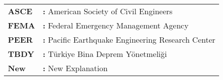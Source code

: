 \hspace{-3mm} %
\begin{tabular}{p{2cm}l}
\textbf{ASCE} & \textbf{:} American Society of Civil Engineers \tabularnewline
\textbf{FEMA}  & \textbf{:} Federal Emergency Management Agency \tabularnewline
\textbf{PEER}  & \textbf{:} Pacific Earthquake Engineering Research Center \tabularnewline
\textbf{TBDY}  & \textbf{:} Türkiye Bina Deprem Yönetmeliği \tabularnewline
\textbf{New} & \textbf{:} New Explanation\tabularnewline
\end{tabular}
